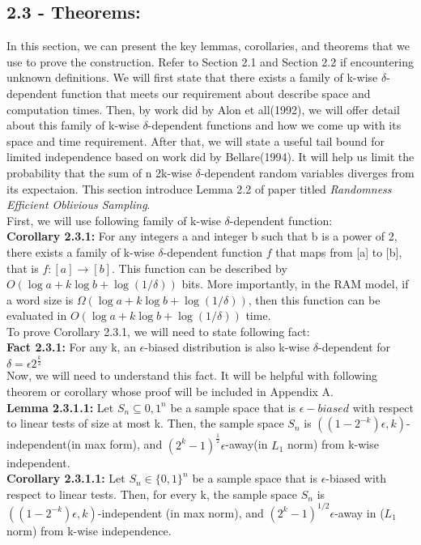 \documentclass[a4paper, english]{paper}
\begin{document}
	\subsection{2.3 - Theorems:}
\quad	In this section, we can present the key lemmas, corollaries, and theorems that we use to prove the construction. Refer to Section 2.1 and Section 2.2 if encountering unknown definitions. We will first state that there exists a family of k-wise $\delta$-dependent function that meets our requirement about describe space and computation times. Then, by work did by Alon et all(1992), we will offer detail about this family of k-wise $\delta$-dependent functions and how we come up with its space and time requirement. After that, we will state a useful tail bound for limited independence based on work did by Bellare(1994). It will help us limit the probability that the sum of n 2k-wise $\delta$-dependent random variables diverges from its expectaion. This section introduce Lemma 2.2 of paper titled  \textit{Randomness Efficient Oblivious Sampling}.\\

	First, we will use following family of k-wise $\delta$-dependent function:\\
	\noindent\textbf{Corollary 2.3.1:} For any integers a and integer b such that b is a power of 2, there exists a family of k-wise $\delta$-dependent function $f$ that maps from [a] to [b], that is $f: [a] \rightarrow [b]$. This function can be described by $O(\log a + k\log b+ \log(1/\delta))$ bits. More importantly, in the RAM model, if a word size is $\Omega(\log a + k\log b+ \log(1/\delta))$, then this function can be evaluated in $O(\log a + k\log b+ \log(1/\delta))$ time. \\

	To prove Corollary 2.3.1, we will need to state following fact:\\
	\noindent\textbf{Fact 2.3.1:} For any k, an $\epsilon$-biased distribution is also k-wise $\delta$-dependent for $\delta=\epsilon2^{\frac k2}$\\

	Now, we will need to understand this fact. It will be helpful with following theorem or corollary whose proof will be included in Appendix A.\\
	\noindent\textbf{Lemma 2.3.1.1:} Let $S_n\subseteq{0,1}^n$ be a sample space that is $\epsilon-biased$ with respect to linear tests of size at most k. Then, the sample space $S_n$ is $((1-2^{-k})\epsilon,k)$-independent(in max form), and $(2^k-1)^{\frac12}\epsilon$-away(in $L_1$ norm) from k-wise independent.\\
	\noindent\textbf{Corollary 2.3.1.1:} Let $S_n \in \{0, 1\}^n$ be a sample space that is $\epsilon$-biased with respect to linear tests. Then, for every k, the sample space $S_n$ is $((1-2^{-k})\epsilon, k)$-independent (in max norm), and $(2^k-1)^{1/2}\epsilon$-away  in ($L_1$ norm) from k-wise independence. \\
\end{document}
